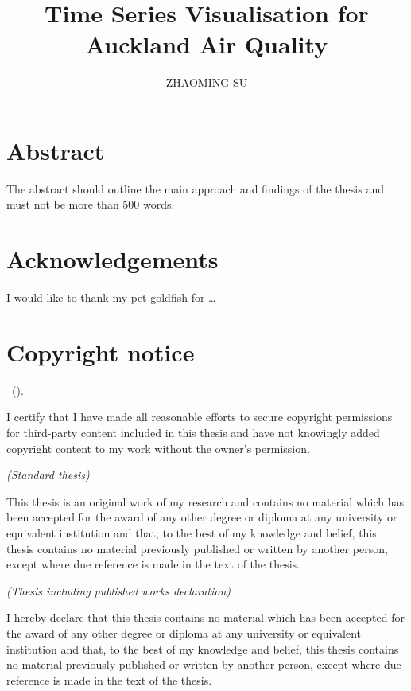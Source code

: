 \documentclass{aucklandthesis}
\author{ZHAOMING SU}
\title{Time Series Visualisation for Auckland Air Quality}
\begin{document}

\titlepage

{\rm\tighttoc\doublespacing}

\hypertarget{abstract}{%
\chapter*{Abstract}\label{abstract}}

The abstract should outline the main approach and findings of the thesis and must not be more than 500 words.

\newpage

\hypertarget{acknowledgements}{%
\chapter*{Acknowledgements}\label{acknowledgements}}

I would like to thank my pet goldfish for \dots

\hypertarget{copyright-notice}{%
\chapter*{Copyright notice}\label{copyright-notice}}

\textcopyright { } \authorname~(\number\the\year).

I certify that I have made all reasonable efforts to secure copyright permissions for third-party content included in this thesis and have not knowingly added copyright content to my work without the owner's permission.

\newpage

\emph{(Standard thesis)}

This thesis is an original work of my research and contains no material which has been accepted for the award of any other degree or diploma at any university or equivalent institution and that, to the best of my knowledge and belief, this thesis contains no material previously published or written by another person, except where due reference is made in the text of the thesis.

\emph{(Thesis including published works declaration)}

I hereby declare that this thesis contains no material which has been accepted for the award of any other degree or diploma at any university or equivalent institution and that, to the best of my knowledge and belief, this thesis contains no material previously published or written by another person, except where due reference is made in the text of the thesis.
\end{document}
